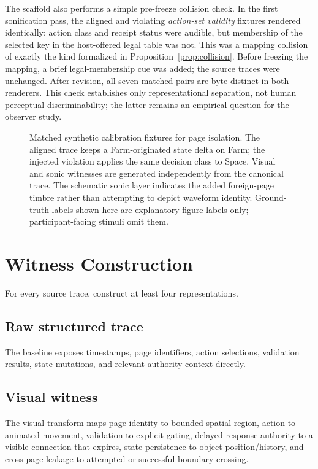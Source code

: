 \documentclass[11pt]{article}
\begin{document}
The scaffold also performs a simple pre-freeze collision check. In the first sonification pass, the aligned and violating \emph{action-set validity} fixtures rendered identically: action class and receipt status were audible, but membership of the selected key in the host-offered legal table was not. This was a mapping collision of exactly the kind formalized in Proposition~\ref{prop:collision}. Before freezing the mapping, a brief legal-membership cue was added; the source traces were unchanged. After revision, all seven matched pairs are byte-distinct in both renderers. This check establishes only representational separation, not human perceptual discriminability; the latter remains an empirical question for the observer study.

\begin{figure}[t]
\centering
\resizebox{0.94\textwidth}{!}{}
\caption{Matched synthetic calibration fixtures for page isolation. The aligned trace keeps a Farm-originated state delta on Farm; the injected violation applies the same decision class to Space. Visual and sonic witnesses are generated independently from the canonical trace. The schematic sonic layer indicates the added foreign-page timbre rather than attempting to depict waveform identity. Ground-truth labels shown here are explanatory figure labels only; participant-facing stimuli omit them.}
\label{fig:calibration-pair}
\end{figure}

\section{Witness Construction}
For every source trace, construct at least four representations.

\subsection{Raw structured trace}
The baseline exposes timestamps, page identifiers, action selections, validation results, state mutations, and relevant authority context directly.

\subsection{Visual witness}
The visual transform maps page identity to bounded spatial region, action to animated movement, validation to explicit gating, delayed-response authority to a visible connection that expires, state persistence to object position/history, and cross-page leakage to attempted or successful boundary crossing.
\end{document}
